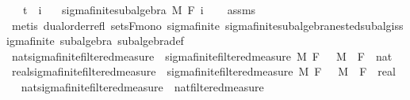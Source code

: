 \begin{isabellebody}
\ \ \ {\isachardoublequoteopen}t\ {\isasymle}\ i{\isachardoublequoteclose}\isanewline
\ \ \ {\isachardoublequoteopen}sigma{\isacharunderscore}{\kern0pt}finite{\isacharunderscore}{\kern0pt}subalgebra\ M\ {\isacharparenleft}{\kern0pt}F\ i{\isacharparenright}{\kern0pt}{\isachardoublequoteclose}\isanewline
%
\isadelimproof
\ \ %
\endisadelimproof
%
\isatagproof
{}\isamarkupfalse%
\ assms\ \isamarkupfalse%
\ {\isacharparenleft}{\kern0pt}metis\ dual{\isacharunderscore}{\kern0pt}order{\isachardot}{\kern0pt}refl\ sets{\isacharunderscore}{\kern0pt}F{\isacharunderscore}{\kern0pt}mono\ sigma{\isacharunderscore}{\kern0pt}finite\ sigma{\isacharunderscore}{\kern0pt}finite{\isacharunderscore}{\kern0pt}subalgebra{\isachardot}{\kern0pt}nested{\isacharunderscore}{\kern0pt}subalg{\isacharunderscore}{\kern0pt}is{\isacharunderscore}{\kern0pt}sigma{\isacharunderscore}{\kern0pt}finite\ subalgebra\ subalgebra{\isacharunderscore}{\kern0pt}def{\isacharparenright}{\kern0pt}%
\endisatagproof
{\isafoldproof}%
%
\isadelimproof
\isanewline
%
\endisadelimproof
\isanewline
{}\isamarkupfalse%
\ nat{\isacharunderscore}{\kern0pt}sigma{\isacharunderscore}{\kern0pt}finite{\isacharunderscore}{\kern0pt}filtered{\isacharunderscore}{\kern0pt}measure\ {\isacharequal}{\kern0pt}\ sigma{\isacharunderscore}{\kern0pt}finite{\isacharunderscore}{\kern0pt}filtered{\isacharunderscore}{\kern0pt}measure\ M\ F\ {}\ \ M\ \ F\ {\isacharcolon}{\kern0pt}{\isacharcolon}{\kern0pt}\ {\isachardoublequoteopen}nat\ {\isasymRightarrow}\ {\isacharunderscore}{\kern0pt}{\isachardoublequoteclose}\isanewline
{}\isamarkupfalse%
\ real{\isacharunderscore}{\kern0pt}sigma{\isacharunderscore}{\kern0pt}finite{\isacharunderscore}{\kern0pt}filtered{\isacharunderscore}{\kern0pt}measure\ {\isacharequal}{\kern0pt}\ sigma{\isacharunderscore}{\kern0pt}finite{\isacharunderscore}{\kern0pt}filtered{\isacharunderscore}{\kern0pt}measure\ M\ F\ {}\ \ M\ \ F\ {\isacharcolon}{\kern0pt}{\isacharcolon}{\kern0pt}\ {\isachardoublequoteopen}real\ {\isasymRightarrow}\ {\isacharunderscore}{\kern0pt}{\isachardoublequoteclose}\isanewline
\isanewline
{}\isamarkupfalse%
\ nat{\isacharunderscore}{\kern0pt}sigma{\isacharunderscore}{\kern0pt}finite{\isacharunderscore}{\kern0pt}filtered{\isacharunderscore}{\kern0pt}measure\ {\isasymsubseteq}\ nat{\isacharunderscore}{\kern0pt}filtered{\isacharunderscore}{\kern0pt}measure%
\isadelimproof

\end{isabellebody}
